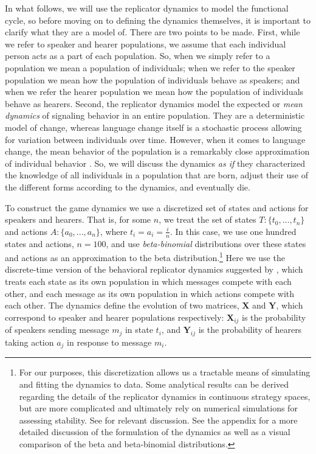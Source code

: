 \documentclass[linguex]{sp}
\theoremstyle{definition} \newtheorem{definition}{Definition}
\begin{document}
In what follows, we will use the replicator dynamics to model the functional cycle, so before moving on to defining the dynamics themselves, it is important to clarify what they are a model of. There are two points to be made. First, while we refer to speaker and hearer populations, we assume that each individual person acts as a part of each population. So, when we simply refer to a population we mean a population of individuals; when we refer to the speaker population we mean how the population of individuals behave as speakers; and when we refer the hearer population we mean how the population of individuals behave as hearers. Second, the replicator dynamics model the expected or \emph{mean dynamics} of signaling behavior in an entire population. They are a deterministic model of change, whereas language change itself is a stochastic process allowing for variation between individuals over time.  However, when it comes to language change, the mean behavior of the population is a remarkably close approximation of individual behavior \citep{kroch1989}. So, we will discuss the dynamics \emph{as if} they characterized the knowledge of all individuals in a population that are born, adjust their use of the different forms according to the dynamics, and eventually die. 


To construct the game dynamics we use a discretized set of states and actions for speakers and hearers. That is, for some $n$, we treat the set of states $T : \{t_0, ..., t_n \}$ and actions $A : \{a_0, ..., a_n \}$, where $t_i = a_i = \frac{i}{n}$. In this case, we use one hundred states and actions, $n=100$, and use \emph{beta-binomial} distributions over these states and actions as an approximation to the beta distribution.\footnote{For our purposes, this discretization allows us a tractable means of simulating and fitting the dynamics to data. Some analytical results can be derived regarding the  details of the replicator dynamics in continuous strategy spaces, but are more complicated  and ultimately rely on numerical simulations for assessing stability. See  \cite{oechssler2002,jager2011} for relevant discussion. See the appendix for a more detailed discussion of the formulation of the dynamics as well as a visual comparison of the beta and beta-binomial distributions.} Here we use the discrete-time version of the behavioral replicator dynamics suggested by \cite{hofbauer-huttegger2015}, which treats each state as its own population in which messages compete with each other, and each message as its own population in which actions compete with each other.  The dynamics define the evolution of two matrices, $\mathbf{X}$  and $\mathbf{Y}$,  which correspond to speaker and hearer populations respectively: $\mathbf{X}_{ij}$ is the probability of speakers sending message $m_j$ in state $t_i$, and $\mathbf{Y}_{ij}$ is the probability of hearers taking action $a_j$ in response to message $m_i$.
\end{document}
